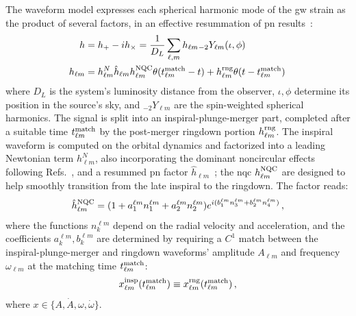 \documentclass[prd,amssymb,amsmath,amsfonts,nofootinbib,reprint,showpacs,longbibliography]{revtex4-1}
\begin{document}
The waveform model expresses each spherical harmonic mode of the \ac{gw} strain as the product of
several factors, in an effective resummation of \ac{pn} results~\cite{??}:
\begin{subequations}
\begin{align}
    h          &= h_+ - i h_\times = \dfrac{1}{D_L} \sum_{\ell, m} h_{\ell m} {}_{-2}Y_{\ell m} (\iota, \phi) \\
    h_{\ell m} &= h_{\ell m}^N \hat{h}_{\ell m} h_{\ell m}^{\rm NQC} \theta(t_{\ell m}^{\rm match} - t) + 
                  h_{\ell m}^{\rm rng} \theta(t - t_{\ell m}^{\rm match})\,
\end{align}
\end{subequations}
where $D_L$ is the system's luminosity distance from the observer, $\iota, \phi$ determine its position
in the source's sky, and ${}_{-2}Y_{\ell m}$ are the spin-weighted spherical harmonics. The signal is split
into an inspiral-plunge-merger part, completed after a suitable time $t_{\ell m}^{\rm match}$ by the post-merger
ringdown portion $h_{\ell m}^{\rm rng}$. The inspiral waveform is computed on the orbital dynamics and
factorized into a leading Newtonian term $h_{\ell m}^N$, also incorporating the dominant noncircular effects
following Refs.~\cite{Chiaramello:2020ehz,Nagar:2021xnh,Albanesi:2021rby}, and a resummed \ac{pn} factor
$\hat{h}_{\ell m}$~\cite{2008gu,...}; the \ac{nqc} $h_{\ell m}^{\rm NQC}$ are designed to
help smoothly transition from the late inspiral to the ringdown. The factor reads:
\begin{equation}
    \hat{h}_{\ell m}^{\rm NQC} = (1 + a_1^{\ell m} n_1^{\ell m} + a_2^{\ell m} n_2^{\ell m}) e^{i (b_1^{\ell m} n_3^{\ell m} + b_2^{\ell m} n_4^{\ell m})}\, ,
\end{equation}
where the functions $n_k^{\ell m}$ depend on the radial velocity and acceleration, and the coefficients $a_k^{\ell m},
b_k^{\ell m}$ are determined by requiring a $C^1$ match between the inspiral-plunge-merger and ringdown
waveforms' amplitude $A_{\ell m}$ and frequency $\omega_{\ell m}$ at the matching time $t_{\ell m}^{\rm match}$:
\begin{equation}
    x_{\ell m}^{\rm insp} (t_{\ell m}^{\rm match}) \equiv x_{\ell m}^{\rm rng} (t_{\ell m}^{\rm match})\, ,
\end{equation}
where $x \in \{A, \dot{A}, \omega, \dot{\omega}\}$.
\end{document}

